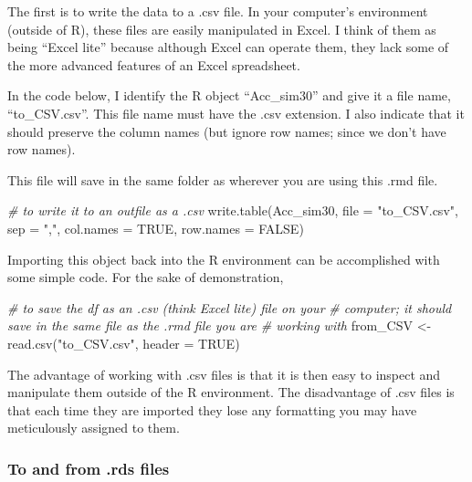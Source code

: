 \documentclass[
  11pt,
]{book}
\newenvironment{Shaded}{\begin{snugshade}}{\end{snugshade}}
\newcommand{\AttributeTok}[1]{\textcolor[rgb]{0.77,0.63,0.00}{#1}}
\newcommand{\CommentTok}[1]{\textcolor[rgb]{0.56,0.35,0.01}{\textit{#1}}}
\newcommand{\ConstantTok}[1]{\textcolor[rgb]{0.00,0.00,0.00}{#1}}
\newcommand{\FunctionTok}[1]{\textcolor[rgb]{0.00,0.00,0.00}{#1}}
\newcommand{\NormalTok}[1]{#1}
\newcommand{\OtherTok}[1]{\textcolor[rgb]{0.56,0.35,0.01}{#1}}
\newcommand{\StringTok}[1]{\textcolor[rgb]{0.31,0.60,0.02}{#1}}
\begin{document}
The first is to write the data to a .csv file. In your computer's environment (outside of R), these files are easily manipulated in Excel. I think of them as being ``Excel lite'' because although Excel can operate them, they lack some of the more advanced features of an Excel spreadsheet.

In the code below, I identify the R object ``Acc\_sim30'' and give it a file name, ``to\_CSV.csv''. This file name must have the .csv extension. I also indicate that it should preserve the column names (but ignore row names; since we don't have row names).

This file will save in the same folder as wherever you are using this .rmd file.

\begin{Shaded}
\begin{Highlighting}[]
\CommentTok{\# to write it to an outfile as a .csv}
\FunctionTok{write.table}\NormalTok{(Acc\_sim30, }\AttributeTok{file =} \StringTok{"to\_CSV.csv"}\NormalTok{, }\AttributeTok{sep =} \StringTok{","}\NormalTok{, }\AttributeTok{col.names =} \ConstantTok{TRUE}\NormalTok{,}
    \AttributeTok{row.names =} \ConstantTok{FALSE}\NormalTok{)}
\end{Highlighting}
\end{Shaded}

Importing this object back into the R environment can be accomplished with some simple code. For the sake of demonstration,

\begin{Shaded}
\begin{Highlighting}[]
\CommentTok{\# to save the df as an .csv (think \textquotesingle{}Excel lite\textquotesingle{}) file on your}
\CommentTok{\# computer; it should save in the same file as the .rmd file you are}
\CommentTok{\# working with}
\NormalTok{from\_CSV }\OtherTok{\textless{}{-}} \FunctionTok{read.csv}\NormalTok{(}\StringTok{"to\_CSV.csv"}\NormalTok{, }\AttributeTok{header =} \ConstantTok{TRUE}\NormalTok{)}
\end{Highlighting}
\end{Shaded}

The advantage of working with .csv files is that it is then easy to inspect and manipulate them outside of the R environment. The disadvantage of .csv files is that each time they are imported they lose any formatting you may have meticulously assigned to them.

\hypertarget{to-and-from-.rds-files}{%
\subsubsection{To and from .rds files}\label{to-and-from-.rds-files}}
\end{document}
